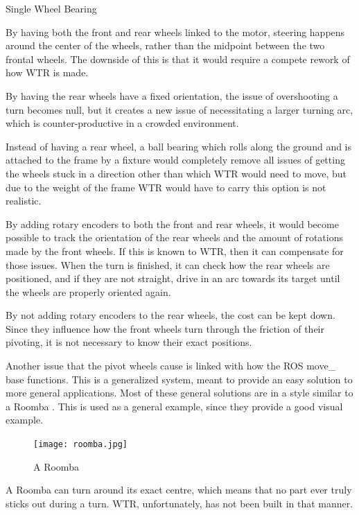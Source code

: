 \begin{labeling}{Single Wheel Bearing}
\item [Tank Controls] By having both the front and rear wheels linked to the motor, steering happens around the center of the wheels, rather than the midpoint between the two frontal wheels. The downside of this is that it would require a compete rework of how WTR is made.
\item [Fixed Rear Wheels] By having the rear wheels have a fixed orientation, the issue of overshooting a turn becomes null, but it creates a new issue of necessitating a larger turning arc, which is counter-productive in a crowded environment.
\item [Single Wheel Bearing] Instead of having a rear wheel, a ball bearing which rolls along the ground and is attached to the frame by a fixture would completely remove all issues of getting the wheels stuck in a direction other than which WTR would need to move, but due to the weight of the frame WTR would have to carry this option is not realistic.
\item [Rotary Encoders] By adding rotary encoders to both the front and rear wheels, it would become possible to track the orientation of the rear wheels and the amount of rotations made by the front wheels. If this is known to WTR, then it can compensate for those issues. When the turn is finished, it can check how the rear wheels are positioned, and if they are not straight, drive in an arc towards its target until the wheels are properly oriented again. 
\item [Front wheel encoders] By not adding rotary encoders to the rear wheels, the cost can be kept down. Since they influence how the front wheels turn through the friction of their pivoting, it is not necessary to know their exact positions.
\end{labeling}

Another issue that the pivot wheels cause is linked with how the ROS move\_ base functions.
This is a generalized system, meant to provide an easy solution to more general applications.
Most of these general solutions are in a style similar to a Roomba \cite{roomba}.
This is used as a general example, since they provide a good visual example.
\begin{figure}[H]
\centering
\texttt{[image: roomba.jpg]}\
\caption{A Roomba}
\label{fig::Roomba}
\end{figure}

A Roomba can turn around its exact centre, which means that no part ever truly sticks out during a turn.
WTR, unfortunately, has not been built in that manner.

